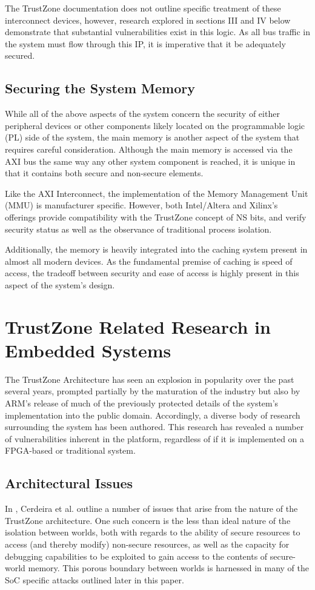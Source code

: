 \documentclass[journal]{IEEEtran}
\begin{document}
The TrustZone documentation does not outline specific treatment of these interconnect
devices, however, research explored in sections III and IV below demonstrate that
substantial vulnerabilities exist in this logic. As all bus traffic in the system must
flow through this IP, it is imperative that it be adequately secured.

\subsection{Securing the System Memory}
While all of the above aspects of the system concern the security of either peripheral
devices or other components likely located on the programmable logic (PL) side of the 
system, the main memory is another aspect of the system that requires careful 
consideration. Although the main memory is accessed via the AXI bus the same way any other
system component is reached, it is unique in that it contains both secure and non-secure
elements.

Like the AXI Interconnect, the implementation of the Memory Management Unit (MMU) is
manufacturer specific. However, both Intel/Altera and Xilinx's offerings provide
compatibility with the TrustZone concept of NS bits, and verify security status as well as
the observance of traditional process isolation. \cite{gross_breaking_2019}

Additionally, the memory is heavily integrated into the caching system present in almost
all modern devices. As the fundamental premise of caching is speed of access, the tradeoff
between security and ease of access is highly present in this aspect of the system's
design. 

\section{TrustZone Related Research in Embedded Systems}
The TrustZone Architecture has seen an explosion in popularity over the past several
years, prompted partially by the maturation of the industry but also by ARM's release of 
much of the previously protected details of the system's implementation into the public
domain. Accordingly, a diverse body of research surrounding the system has been authored.
This research has revealed a number of vulnerabilities inherent in the platform,
regardless of if it is implemented on a FPGA-based or traditional system.

\subsection{Architectural Issues}
In \cite{cerdeira_sok_nodate}, Cerdeira et al. outline a number of issues that arise from
the nature of the TrustZone architecture. One such concern is the less than ideal nature 
of the isolation between worlds, both with regards to the ability of secure resources to
access (and thereby modify) non-secure resources, as well as the capacity for debugging
capabilities to be exploited to gain access to the contents of secure-world memory. This
porous boundary between worlds is harnessed in many of the SoC specific attacks outlined
later in this paper.
\end{document}
